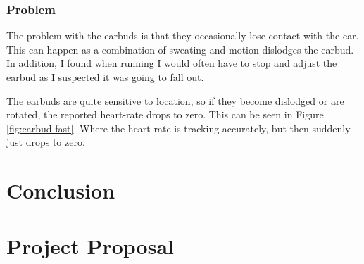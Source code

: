 \documentclass[12pt,a4paper,twoside,openright]{report}
\begin{document}
\subsection{Problem} \label{section:earbud-problem}

The problem with the earbuds is that they occasionally lose contact with the
ear. This can happen as a combination of sweating and motion dislodges the
earbud. In addition, I found when running I would often have to stop and
adjust the earbud as I suspected it was going to fall out. 

The earbuds are quite sensitive to location, so if they become dislodged or
are rotated, the reported heart-rate drops to zero. This can be seen in Figure
\ref{fig:earbud-fast}. Where the heart-rate is tracking accurately, but then
suddenly just drops to zero.

\chapter{Conclusion}




\appendix

\chapter{Project Proposal}


\end{document}
